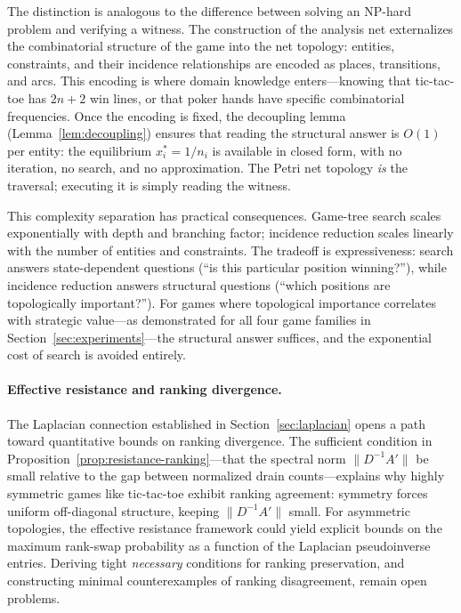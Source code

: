 \documentclass[11pt,a4paper]{article}
\begin{document}
The distinction is analogous to the difference between solving an NP-hard problem and verifying a witness.
The construction of the analysis net externalizes the combinatorial structure of the game into the net topology: entities, constraints, and their incidence relationships are encoded as places, transitions, and arcs.
This encoding is where domain knowledge enters---knowing that tic-tac-toe has $2n + 2$ win lines, or that poker hands have specific combinatorial frequencies.
Once the encoding is fixed, the decoupling lemma (Lemma~\ref{lem:decoupling}) ensures that reading the structural answer is $O(1)$ per entity: the equilibrium $x_i^* = 1/n_i$ is available in closed form, with no iteration, no search, and no approximation.
The Petri net topology \emph{is} the traversal; executing it is simply reading the witness.

This complexity separation has practical consequences.
Game-tree search scales exponentially with depth and branching factor; incidence reduction scales linearly with the number of entities and constraints.
The tradeoff is expressiveness: search answers state-dependent questions (``is this particular position winning?''), while incidence reduction answers structural questions (``which positions are topologically important?'').
For games where topological importance correlates with strategic value---as demonstrated for all four game families in Section~\ref{sec:experiments}---the structural answer suffices, and the exponential cost of search is avoided entirely.

\paragraph{Effective resistance and ranking divergence.}
The Laplacian connection established in Section~\ref{sec:laplacian} opens a path toward quantitative bounds on ranking divergence.
The sufficient condition in Proposition~\ref{prop:resistance-ranking}---that the spectral norm $\|D^{-1}A'\|$ be small relative to the gap between normalized drain counts---explains why highly symmetric games like tic-tac-toe exhibit ranking agreement: symmetry forces uniform off-diagonal structure, keeping $\|D^{-1}A'\|$ small.
For asymmetric topologies, the effective resistance framework could yield explicit bounds on the maximum rank-swap probability as a function of the Laplacian pseudoinverse entries.
Deriving tight \emph{necessary} conditions for ranking preservation, and constructing minimal counterexamples of ranking disagreement, remain open problems.
\end{document}
